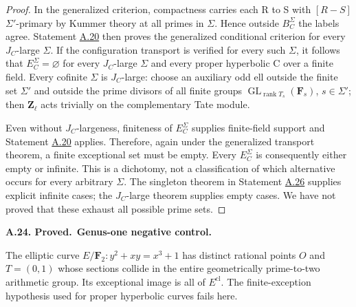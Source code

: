 \documentclass[11pt,a4paper]{article}
\newcommand{\cl}{\mathrm{cl}}
\newenvironment{claim}[3]{\par\medskip\noindent\hypertarget{#1}{\textbf{#1. #2.}}\ \textbf{#3.}\par\nopagebreak\smallskip\begingroup\itshape}{\endgroup\par\smallskip}
\newcommand{\statementref}[1]{\hyperlink{#1}{#1}}
\begin{document}
\begin{proof}
In the generalized criterion, compactness carries each R to S with \([R-S]\) \({\Sigma}'\)-primary by Kummer theory at all primes in \({\Sigma}\). Hence outside \(B_C^{\Sigma}\) the labels agree. Statement \statementref{A.20} then proves the generalized conditional criterion for every \(J_C\)-large \({\Sigma}\). If the configuration transport is verified for every such \({\Sigma}\), it follows that \(E_C^{\Sigma}=\varnothing\) for every \(J_C\)-large \({\Sigma}\) and every proper hyperbolic C over a finite field. Every cofinite \({\Sigma}\) is \(J_C\)-large: choose an auxiliary odd ell outside the finite set \({\Sigma}'\) and outside the prime divisors of all finite groups \(\operatorname{GL}_{\operatorname{rank}T_s}(\mathbf F_s)\), \(s{\in}{\Sigma}'\); then \(\mathbf{Z}_\ell\) acts trivially on the complementary Tate module.

Even without \(J_C\)-largeness, finiteness of \(E_C^{\Sigma}\) supplies finite-field support and Statement \statementref{A.20} applies. Therefore, again under the generalized transport theorem, a finite exceptional set must be empty. Every \(E_C^{\Sigma}\) is consequently either empty or infinite. This is a dichotomy, not a classification of which alternative occurs for every arbitrary \({\Sigma}\). The singleton theorem in Statement \statementref{A.26} supplies explicit infinite cases; the \(J_C\)-large theorem supplies empty cases. We have not proved that these exhaust all possible prime sets.


\end{proof}

\begin{claim}{A.24}{Proved}{Genus-one negative control}

The elliptic curve $E/\mathbf F_2:y^2+xy=x^3+1$ has distinct
rational points $O$ and $T=(0,1)$ whose sections collide in the
entire geometrically prime-to-two arithmetic group. Its exceptional
image is all of $E^{\cl}$. The finite-exception hypothesis used for
proper hyperbolic curves fails here.

\end{claim}
\end{document}
